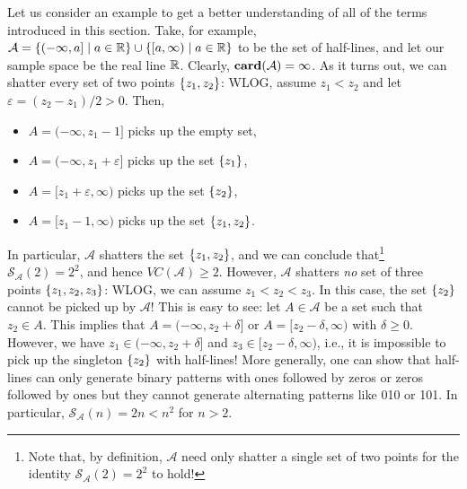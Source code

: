 Let us consider an example to get a better understanding of all of the terms introduced in this section. Take, for example, $\mathcal{A} = \left\{(-\infty, a] \mathrel{|} a \in \mathbb{R}\right\} \cup \left\{[a, \infty) \mathrel{|} a \in \mathbb{R}\right\}$ to be the set of half-lines, and let our sample space be the real line $\mathbb{R}$. Clearly, $\mathrm{\mathbf{card}}(\mathcal{A}) = \infty$. As it turns out, we can shatter every set of two points $\left\{z_1, z_2\right\}$: WLOG, assume $z_1 < z_2$ and let $\varepsilon = (z_2 - z_1)/2 > 0$. Then,
\begin{itemize}
    \item $A = (-\infty, z_1 - 1]$ picks up the empty set,

    \item $A = (-\infty, z_1 + \varepsilon]$ picks up the set $\left\{z_1\right\}$,

    \item $A = [z_1 + \varepsilon, \infty)$ picks up the set $\left\{z_2\right\}$,

    \item $A = [z_1 - 1, \infty)$ picks up the set $\left\{z_1, z_2\right\}$.
\end{itemize}
In particular, $\mathcal{A}$ shatters the set $\left\{z_1, z_2\right\}$, and we can conclude that\footnote{Note that, by definition, $\mathcal{A}$ need only shatter a single set of two points for the identity $\mathcal{S}_{\mathcal{A}}(2) = 2^2$ to hold!} $\mathcal{S}_{\mathcal{A}}(2) = 2^2$, and hence $VC(\mathcal{A}) \geq 2$. However, $\mathcal{A}$ shatters \emph{no} set of three points $\left\{z_1, z_2, z_3\right\}$: WLOG, we can assume $z_1 < z_2 < z_3$. In this case, the set $\left\{z_2\right\}$ cannot be picked up by $\mathcal{A}$! This is easy to see: let $A \in \mathcal{A}$ be a set such that $z_2 \in A$. This implies that $A = (-\infty, z_2 + \delta]$ or $A = [z_2 - \delta, \infty)$ with $\delta \geq 0$. However, we have $z_1 \in (-\infty, z_2 + \delta]$ and $z_3 \in [z_2 - \delta, \infty)$, i.e., it is impossible to pick up the singleton $\left\{z_2\right\}$ with half-lines! More generally, one can show that half-lines can only generate binary patterns with ones followed by zeros or zeros followed by ones but they cannot generate alternating patterns like 010 or 101. In particular, $\mathcal{S}_{\mathcal{A}}(n) = 2n < n^2$ for $n > 2$.

